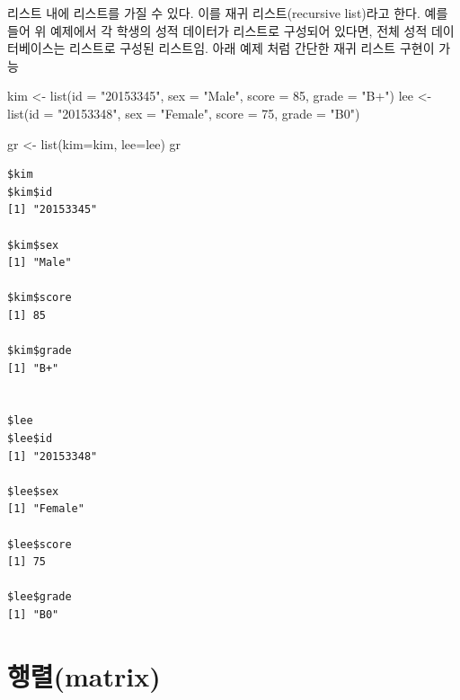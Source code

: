 \documentclass[
  11pt,
]{krantz}
\makeatletter
\newenvironment{Shaded}{\begin{snugshade}}{\end{snugshade}}
\newcommand{\AttributeTok}[1]{\textcolor[rgb]{0.61,0.61,0.61}{#1}}
\newcommand{\DecValTok}[1]{\textcolor[rgb]{0.06,0.06,0.06}{#1}}
\newcommand{\FunctionTok}[1]{\textcolor[rgb]{0,0,0}{#1}}
\newcommand{\NormalTok}[1]{#1}
\newcommand{\OtherTok}[1]{\textcolor[rgb]{0.37,0.37,0.37}{#1}}
\newcommand{\StringTok}[1]{\textcolor[rgb]{0.5,0.5,0.5}{#1}}
\newenvironment{kframe}{%
\medskip{}
\setlength{\fboxsep}{.8em}
 \def\at@end@of@kframe{}%
 \ifinner\ifhmode%
  \def\at@end@of@kframe{\end{minipage}}%
  \begin{minipage}{\columnwidth}%
 \fi\fi%
 \def\FrameCommand##1{\hskip\@totalleftmargin \hskip-\fboxsep
 \colorbox{shadecolor}{##1}\hskip-\fboxsep
     \hskip-\linewidth \hskip-\@totalleftmargin \hskip\columnwidth}%
 \MakeFramed {\advance\hsize-\width
   \@totalleftmargin\z@ \linewidth\hsize
   \@setminipage}}%
 {\par\unskip\endMakeFramed%
 \at@end@of@kframe}
\newenvironment{rmdblock}[1]
  {
  \begin{itemize}
  \renewcommand{\labelitemi}{
    \raisebox{-.7\height}[0pt][0pt]{
      {\setkeys{Gin}{width=3em,keepaspectratio}\texttt{[image: images/\#1]}}
    }
  }
  \setlength{\fboxsep}{1em}
  \begin{kframe}
  \item
  }
  {
  \end{kframe}
  \end{itemize}
  }
\newenvironment{rmdnote}
  {\begin{rmdblock}{note}}
  {\end{rmdblock}}
\makeatother
\begin{document}
\normalsize

\footnotesize

\begin{rmdnote}
리스트 내에 리스트를 가질 수 있다. 이를 재귀 리스트(recursive list)라고 한다. 예를 들어 위 예제에서 각 학생의 성적 데이터가 리스트로 구성되어 있다면, 전체 성적 데이터베이스는 리스트로 구성된 리스트임. 아래 예제 처럼 간단한 재귀 리스트 구현이 가능
\end{rmdnote}

\normalsize

\footnotesize

\begin{Shaded}
\begin{Highlighting}[]
\NormalTok{kim }\OtherTok{\textless{}{-}} \FunctionTok{list}\NormalTok{(}\AttributeTok{id =} \StringTok{"20153345"}\NormalTok{, }\AttributeTok{sex =} \StringTok{"Male"}\NormalTok{, }\AttributeTok{score =} \DecValTok{85}\NormalTok{, }\AttributeTok{grade =} \StringTok{"B+"}\NormalTok{)}
\NormalTok{lee }\OtherTok{\textless{}{-}} \FunctionTok{list}\NormalTok{(}\AttributeTok{id =} \StringTok{"20153348"}\NormalTok{, }\AttributeTok{sex =} \StringTok{"Female"}\NormalTok{, }\AttributeTok{score =} \DecValTok{75}\NormalTok{, }\AttributeTok{grade =} \StringTok{"B0"}\NormalTok{)}

\NormalTok{gr }\OtherTok{\textless{}{-}} \FunctionTok{list}\NormalTok{(}\AttributeTok{kim=}\NormalTok{kim, }\AttributeTok{lee=}\NormalTok{lee)}
\NormalTok{gr}
\end{Highlighting}
\end{Shaded}

\begin{verbatim}
$kim
$kim$id
[1] "20153345"

$kim$sex
[1] "Male"

$kim$score
[1] 85

$kim$grade
[1] "B+"


$lee
$lee$id
[1] "20153348"

$lee$sex
[1] "Female"

$lee$score
[1] 75

$lee$grade
[1] "B0"
\end{verbatim}

\normalsize

\hypertarget{matrix}{%
\section{행렬(matrix)}\label{matrix}}

\footnotesize
\end{document}
